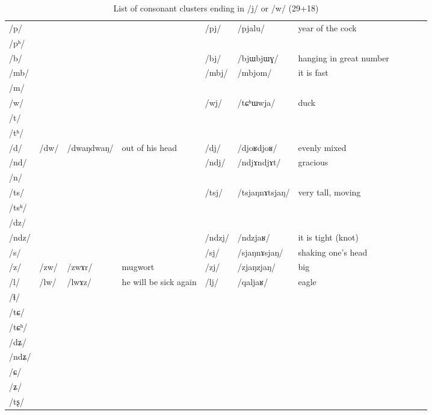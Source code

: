 \documentclass[oldfontcommands,oneside,a4paper,11pt]{article}
\newcommand{\ipa}[1]{\mbox{/#1/}} %
\newcommand{\deux}[1]{/#1/}
\newcommand{\idph}[1]{\cellcolor{gray}\textbf{#1}}
\begin{document}
\begin{landscape}
 \begin{longtable}{l|lll|lll|lll|l}
 \caption{List of consonant clusters ending in \ipa{j} or \ipa{w} (29+18)} \label{med.w.j} \\%
\toprule
\ipa{p} 	& 	& 	&	&\deux{pj} 	&\ipa{pjalu} 	&year of the cock\\	
\ipa{pʰ} 	& 	& 	&	& 	& 	&\\	
\ipa{b} 	& 	& 	&	&\deux{bj}\idph{} 	&\ipa{bjɯbjɯɣ} 	& hanging in great number\\	
\ipa{mb} 	& 	& 	&	&\deux{mbj} 	&\ipa{mbjom} 	&it is fast\\	
\ipa{m} 	& 	& 	&	& 	& 	&\\	
\ipa{w} 	& 	& 	&	&\deux{wj} 	&\ipa{tɕʰɯwja} 	&duck \\	
\ipa{t} 	& 	& 	&	& 	& 	&\\	
\ipa{tʰ} 	& 	& 	&	& 	& 	&\\	
\ipa{d} 	&\deux{dw}\idph{} 	&\ipa{dwaŋdwaŋ} 	&out of his head	&\deux{dj} \idph{}	&\ipa{djoʁdjoʁ} 	&evenly mixed\\	
\ipa{nd} 	& 	& 	&	&\deux{ndj} \idph{}	&\ipa{ndjɤndjɤt} 	&gracious\\	
\ipa{n} 	& 	& 	&	& 	& 	&\\	
\ipa{ts} 	& 	& 	&	& \deux{tsj} 	&\ipa{tsjaŋnɤtsjaŋ}	&very tall, moving \\	
\ipa{tsʰ} 	& 	& 	&	& 	& 	&\\	
\ipa{dz} 	& 	& 	&	& 	& 	&\\	
\ipa{ndz} 	& 	& 	&	&\deux{ndzj} 	&\ipa{ndzjaʁ} 	&it is tight (knot)\\	
\ipa{s} 	& 	& 	&	&\deux{sj} \idph{}	&\ipa{sjaŋnɤsjaŋ} 	&shaking one's head\\	
\ipa{z} 	&\deux{zw} 	&\ipa{zwɤr} 	&mugwort	&\deux{zj} \idph{}	&\ipa{zjaŋzjaŋ} 	&big\\	
\ipa{l} 	&\deux{lw} 	&\ipa{lwɤz} 	&he will be sick again	&\deux{lj} 	&\ipa{qaljaʁ} 	&eagle\\	
\ipa{ɬ} 	& 	& 	&	& 	& 	&\\	
\ipa{tɕ} 	& 	& 	&	& 	& 	&\\	
\ipa{tɕʰ} 	& 	& 	&	& 	& 	&\\	
\ipa{dʑ} 	& 	& 	&	& 	& 	&\\	
\ipa{ndʑ} 	& 	& 	&	& 	& 	&\\	
\ipa{ɕ} 	& 	& 	&	& 	& 	&\\	
\ipa{ʑ} 	& 	& 	&	& 	& 	&\\	
\ipa{tʂ} 	& 	& 	&	& 	& 	&\\	

\end{longtable}
\end{landscape}
\end{document}
